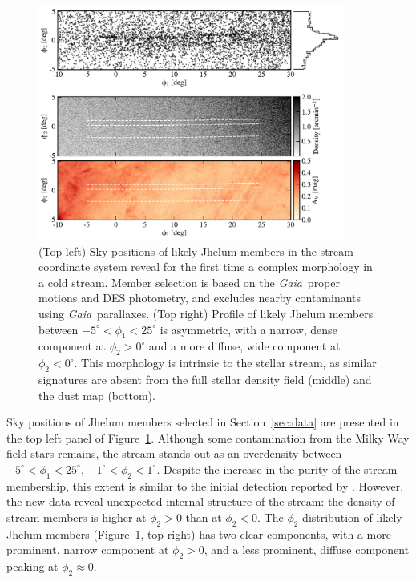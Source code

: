 \documentclass[twocolumn]{aastex62}
\newcommand{\gaia}{\textsl{Gaia}}
\begin{document}
\begin{figure}
\begin{center}
\includegraphics[width=0.9\textwidth]{map.pdf}
\end{center}
\caption{
(Top left) Sky positions of likely Jhelum members in the stream coordinate system reveal for the first time a complex morphology in a cold stream.
Member selection is based on the \gaia\ proper motions and DES photometry, and excludes nearby contaminants using \gaia\ parallaxes.
(Top right) Profile of likely Jhelum members between $-5^\circ<\phi_1<25^\circ$ is asymmetric, with a narrow, dense component at $\phi_2>0^\circ$ and a more diffuse, wide component at $\phi_2<0^\circ$.
This morphology is intrinsic to the stellar stream, as similar signatures are absent from the full stellar density field (middle) and the dust map (bottom).
}
\label{fig:map}
\end{figure}

Sky positions of Jhelum members selected in Section~\ref{sec:data} are presented in the top left panel of Figure~\ref{fig:map}.
Although some contamination from the Milky Way field stars remains, the stream stands out as an overdensity between $-5^\circ<\phi_1<25^\circ$, $-1^\circ<\phi_2<1^\circ$.
Despite the increase in the purity of the stream membership, this extent is similar to the initial detection reported by \citet{shipp2018}.
However, the new data reveal unexpected internal structure of the stream: the density of stream members is higher at $\phi_2>0$ than at $\phi_2<0$.
The $\phi_2$ distribution of likely Jhelum members (Figure~\ref{fig:map}, top right) has two clear components, with a more prominent, narrow component at $\phi_2>0$, and a less prominent, diffuse component peaking at $\phi_2\approx0$.
\end{document}
